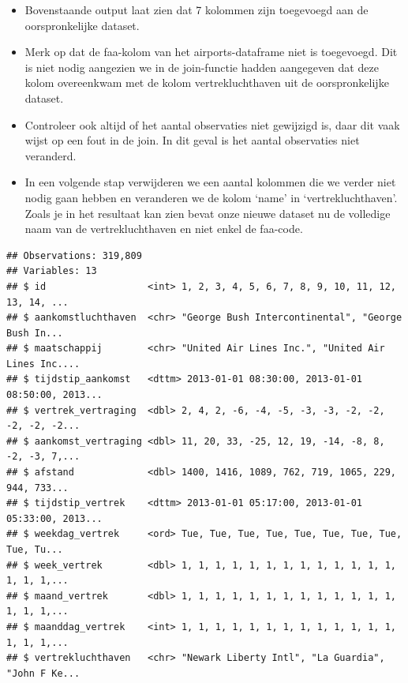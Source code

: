\documentclass[]{tufte-book}
\newenvironment{Shaded}{}{}
\newcommand{\DataTypeTok}[1]{\textcolor[rgb]{0.56,0.13,0.00}{#1}}
\newcommand{\KeywordTok}[1]{\textcolor[rgb]{0.00,0.44,0.13}{\textbf{#1}}}
\newcommand{\NormalTok}[1]{#1}
\newcommand{\OperatorTok}[1]{\textcolor[rgb]{0.40,0.40,0.40}{#1}}
\newcommand{\StringTok}[1]{\textcolor[rgb]{0.25,0.44,0.63}{#1}}
\providecommand{\tightlist}{%
  \setlength{\itemsep}{0pt}\setlength{\parskip}{0pt}}
\begin{document}
\begin{itemize}
\tightlist
\item
  Bovenstaande output laat zien dat 7 kolommen zijn toegevoegd aan de oorspronkelijke dataset.
\item
  Merk op dat de faa-kolom van het airports-dataframe niet is toegevoegd. Dit is niet nodig aangezien we in de join-functie hadden aangegeven dat deze kolom overeenkwam met de kolom vertrekluchthaven uit de oorspronkelijke dataset.
\item
  Controleer ook altijd of het aantal observaties niet gewijzigd is, daar dit vaak wijst op een fout in de join. In dit geval is het aantal observaties niet veranderd.
\item
  In een volgende stap verwijderen we een aantal kolommen die we verder niet nodig gaan hebben en veranderen we de kolom `name' in `vertrekluchthaven'. Zoals je in het resultaat kan zien bevat onze nieuwe dataset nu de volledige naam van de vertrekluchthaven en niet enkel de faa-code.
\end{itemize}

\begin{Shaded}
\end{Shaded}

\begin{verbatim}
## Observations: 319,809
## Variables: 13
## $ id                  <int> 1, 2, 3, 4, 5, 6, 7, 8, 9, 10, 11, 12, 13, 14, ...
## $ aankomstluchthaven  <chr> "George Bush Intercontinental", "George Bush In...
## $ maatschappij        <chr> "United Air Lines Inc.", "United Air Lines Inc....
## $ tijdstip_aankomst   <dttm> 2013-01-01 08:30:00, 2013-01-01 08:50:00, 2013...
## $ vertrek_vertraging  <dbl> 2, 4, 2, -6, -4, -5, -3, -3, -2, -2, -2, -2, -2...
## $ aankomst_vertraging <dbl> 11, 20, 33, -25, 12, 19, -14, -8, 8, -2, -3, 7,...
## $ afstand             <dbl> 1400, 1416, 1089, 762, 719, 1065, 229, 944, 733...
## $ tijdstip_vertrek    <dttm> 2013-01-01 05:17:00, 2013-01-01 05:33:00, 2013...
## $ weekdag_vertrek     <ord> Tue, Tue, Tue, Tue, Tue, Tue, Tue, Tue, Tue, Tu...
## $ week_vertrek        <dbl> 1, 1, 1, 1, 1, 1, 1, 1, 1, 1, 1, 1, 1, 1, 1, 1,...
## $ maand_vertrek       <dbl> 1, 1, 1, 1, 1, 1, 1, 1, 1, 1, 1, 1, 1, 1, 1, 1,...
## $ maanddag_vertrek    <int> 1, 1, 1, 1, 1, 1, 1, 1, 1, 1, 1, 1, 1, 1, 1, 1,...
## $ vertrekluchthaven   <chr> "Newark Liberty Intl", "La Guardia", "John F Ke...
\end{verbatim}
\end{document}
